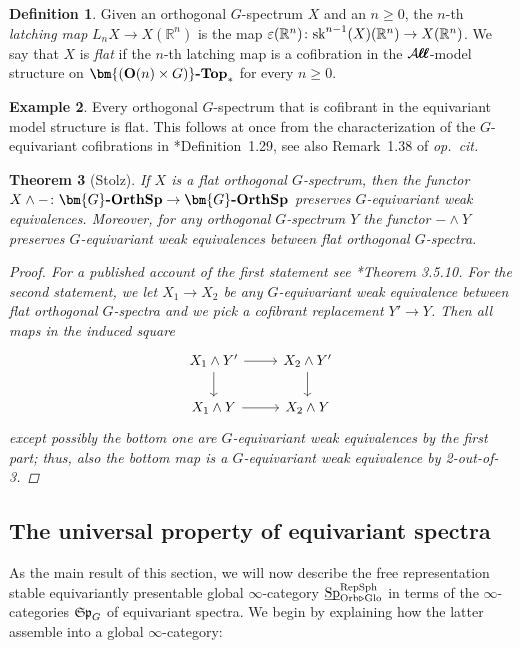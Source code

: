 \documentclass[reqno]{memo-l}
\theoremstyle{mythm}
\newtheorem{thm}{Theorem}[section]
\theoremstyle{definition}
\newtheorem{ex}[thm]{Example}
\newtheorem{definition}[thm]{Definition}
\numberwithin{equation}{section}
\newcommand{\Aa}{{\mathcal{A}}}
\newcommand{\R} {{\mathbb{R}}}
\renewcommand{\epsilon}{\varepsilon}
\newcommand{\sk}{{\textup{sk}}}
\DeclareMathOperator{\Sp}{Sp}
\newcommand{\cat}[1]{\textbf{\textup{#1}}}
\renewcommand{\O}{{\textup{O}}}
\newcommand{\bigAll}{\hbox{\hfuzz=20pt\hbox{$\mathcal A\kern-.3pt$}\setbox0=\hbox{$\ell\kern-.75pt\ell$}\hbox to 0pt{\hfuzz=8pt\kern-.075pt\unhcopy0}\hbox to 0pt{\hfuzz=8pt\kern.075pt\unhcopy0}\box0\kern.05pt}}
\newcommand{\smallAll}{\Aa\kern-.3pt\ell\kern-.6pt\ell}
\newcommand{\All}{\mathchoice{\bigAll}{\bigAll}{\smallAll}{\smallAll}}
\newcommand{\Orb}{{\vphantom{\textup{t}}\smash{\textup{Orb}}}}
\newcommand{\Glo}{\textup{Glo}}
\newcommand{\ulhelper}[2]{\underline{\setbox0=\hbox{$#1#2$}\dp0=0.4pt \box0\relax}}
\newcommand{\ul}[1]{{\mathpalette\ulhelper{#1}}\hbox{\rule[-2pt]{0pt}{0pt}}}
\let\smashp=\wedge
\newcommand{\mySp}{{\mathfrak S\kern-.5pt\mathfrak p}}
\newcommand{\Gosp}[1]{\cat{$\bm{#1}$-OrthSp}}
\begin{document}
\begin{definition}\label{def:flat}
    Given an orthogonal $G$-spectrum $X$ and an $n\ge0$, the $n$-th \emph{latching map} $L_nX\to X(\R^n)$ is the map $\epsilon(\R^n)\colon\sk^{n-1}(X)(\R^n)\to X(\R^n)$. We say that $X$ is \emph{flat} if the $n$-th latching map is a cofibration in the $\All$-model structure on $\cat{$\bm{(\O(n)\times G)}$-Top}_*$ for every $n\ge0$.
\end{definition}

\begin{ex}\label{ex:equiv-cofibrant-flat}
    Every orthogonal $G$-spectrum that is cofibrant in the equivariant model structure is flat. This follows at once from the characterization of the $G$-equivariant cofibrations in \cite{DHLPS2019Proper}*{Definition~1.29}, see also Remark~1.38 of \emph{op.\ cit.}
\end{ex}

\begin{thm}[Stolz]\label{thm:equiv-flatness}
    If $X$ is a flat orthogonal $G$-spectrum, then the functor $X\smashp{-}\colon\Gosp{G}\to\Gosp{G}$ preserves $G$-equivariant weak equivalences. Moreover, for \emph{any} orthogonal $G$-spectrum $Y$ the functor ${-}\smashp Y$ preserves $G$-equivariant weak equivalences between flat orthogonal $G$-spectra.
    \begin{proof}
        For a published account of the first statement see \cite{schwede2018global}*{Theorem 3.5.10}. For the second statement, we let $X_1\to X_2$ be any $G$-equivariant weak equivalence between flat orthogonal $G$-spectra and we pick a cofibrant replacement $Y'\to Y$. Then all maps in the induced square 
        \[
            \begin{tikzcd}
                X_1\smashp Y'\arrow[r]\arrow[d] & X_2\smashp Y'\arrow[d]\\
                X_1\smashp Y\arrow[r] & X_2\smashp Y
            \end{tikzcd}
        \]
        except possibly the bottom one are $G$-equivariant weak equivalences by the first part; thus, also the bottom map is a $G$-equivariant weak equivalence by 2-out-of-3.
    \end{proof}
\end{thm}

\subsection{The universal property of equivariant spectra} As the main result of this section, we will now describe the free representation stable equivariantly presentable global $\infty$-category $\ul\Sp_{\Orb\triangleright\Glo}^\textup{RepSph}$ in terms of the $\infty$-categories $\mySp_G$ of equivariant spectra. We begin by explaining how the latter assemble into a global $\infty$-category:
\end{document}
